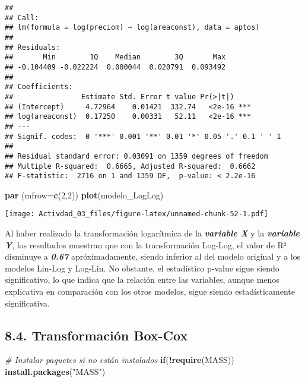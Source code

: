 \documentclass[
]{article}
\newenvironment{Shaded}{\begin{snugshade}}{\end{snugshade}}
\newcommand{\AttributeTok}[1]{\textcolor[rgb]{0.13,0.29,0.53}{#1}}
\newcommand{\CommentTok}[1]{\textcolor[rgb]{0.56,0.35,0.01}{\textit{#1}}}
\newcommand{\ControlFlowTok}[1]{\textcolor[rgb]{0.13,0.29,0.53}{\textbf{#1}}}
\newcommand{\DecValTok}[1]{\textcolor[rgb]{0.00,0.00,0.81}{#1}}
\newcommand{\FunctionTok}[1]{\textcolor[rgb]{0.13,0.29,0.53}{\textbf{#1}}}
\newcommand{\NormalTok}[1]{#1}
\newcommand{\SpecialCharTok}[1]{\textcolor[rgb]{0.81,0.36,0.00}{\textbf{#1}}}
\newcommand{\StringTok}[1]{\textcolor[rgb]{0.31,0.60,0.02}{#1}}
\begin{document}
\begin{verbatim}
## 
## Call:
## lm(formula = log(preciom) ~ log(areaconst), data = aptos)
## 
## Residuals:
##       Min        1Q    Median        3Q       Max 
## -0.104409 -0.022224  0.000044  0.020791  0.093492 
## 
## Coefficients:
##                Estimate Std. Error t value Pr(>|t|)    
## (Intercept)     4.72964    0.01421  332.74   <2e-16 ***
## log(areaconst)  0.17250    0.00331   52.11   <2e-16 ***
## ---
## Signif. codes:  0 '***' 0.001 '**' 0.01 '*' 0.05 '.' 0.1 ' ' 1
## 
## Residual standard error: 0.03091 on 1359 degrees of freedom
## Multiple R-squared:  0.6665, Adjusted R-squared:  0.6662 
## F-statistic:  2716 on 1 and 1359 DF,  p-value: < 2.2e-16
\end{verbatim}

\begin{Shaded}
\begin{Highlighting}[]
\FunctionTok{par}\NormalTok{ (}\AttributeTok{mfrow=}\FunctionTok{c}\NormalTok{(}\DecValTok{2}\NormalTok{,}\DecValTok{2}\NormalTok{))}
\FunctionTok{plot}\NormalTok{(modelo\_LogLog)}
\end{Highlighting}
\end{Shaded}

\texttt{[image: Activdad\_03\_files/figure-latex/unnamed-chunk-52-1.pdf]}

Al haber realizado la transformación logarítmica de la
\textbf{\emph{variable X}} y la \textbf{\emph{variable Y}}, los
resultados muestran que con la transformación Log-Log, el valor de R²
disminuye a \textbf{\emph{0.67}} apróximadamente, siendo inferior al del
modelo original y a los modelos Lin-Log y Log-Lin. No obstante, el
estadístico p-value sigue siendo significativo, lo que indica que la
relación entre las variables, aunque menos explicativa en comparación
con los otros modelos, sigue siendo estadísticamente significativa.

\subsection{\texorpdfstring{\textbf{8.4. Transformación
Box-Cox}}{8.4. Transformación Box-Cox}}\label{transformaciuxf3n-box-cox}

\begin{Shaded}
\begin{Highlighting}[]
\CommentTok{\# Instalar paquetes si no están instalados}
\ControlFlowTok{if}\NormalTok{(}\SpecialCharTok{!}\FunctionTok{require}\NormalTok{(MASS)) }\FunctionTok{install.packages}\NormalTok{(}\StringTok{"MASS"}\NormalTok{)}
\end{Highlighting}
\end{Shaded}
\end{document}

